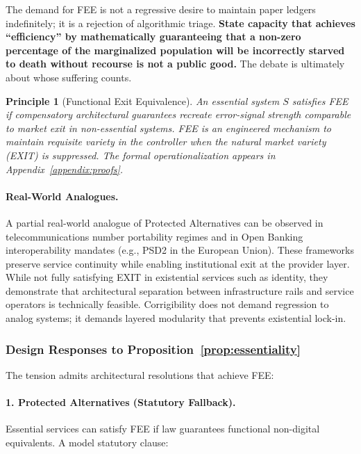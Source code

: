 \documentclass{article}
\newtheorem{principle}{Principle}
\begin{document}
The demand for FEE is not a regressive desire to maintain paper ledgers indefinitely; it is a rejection of algorithmic triage. \textbf{State capacity that achieves ``efficiency'' by mathematically guaranteeing that a non-zero percentage of the marginalized population will be incorrectly starved to death without recourse is not a public good.} The debate is ultimately about whose suffering counts.

\begin{principle}[Functional Exit Equivalence]
An essential system $S$ satisfies FEE if compensatory architectural guarantees recreate error-signal strength comparable to market exit in non-essential systems. FEE is an engineered mechanism to maintain requisite variety in the controller when the natural market variety (EXIT) is suppressed. The formal operationalization appears in Appendix~\ref{appendix:proofs}.
\end{principle}

\paragraph{Real-World Analogues.} A partial real-world analogue of Protected Alternatives can be observed in telecommunications number portability regimes and in Open Banking interoperability mandates (e.g., PSD2 in the European Union). These frameworks preserve service continuity while enabling institutional exit at the provider layer. While not fully satisfying EXIT in existential services such as identity, they demonstrate that architectural separation between infrastructure rails and service operators is technically feasible. Corrigibility does not demand regression to analog systems; it demands layered modularity that prevents existential lock-in.

\subsubsection{Design Responses to Proposition~\ref{prop:essentiality}}
\label{subsubsec:arch-responses}

The tension admits architectural resolutions that achieve FEE:

\paragraph{1. Protected Alternatives (Statutory Fallback).} Essential services can satisfy FEE if law guarantees functional non-digital equivalents. A model statutory clause:
\end{document}
